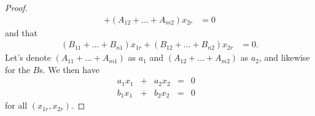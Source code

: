 \documentclass[12pt]{article}
\begin{document}
\begin{enumerate}
\begin{thm}
\begin{proof}
\begin{align*}
          + (A_{12} + \ldots + A_{m2})x_{2r}
          &= 0
        \end{align*}
        and that
        \begin{align*}
        (B_{11} + \ldots + B_{n1})x_{1r}
          + (B_{12} + \ldots + B_{n2})x_{2r}
          &= 0.
        \end{align*}
        Let's denote $(A_{11} + \ldots + A_{m1})$ as $a_1$ and
        $(A_{12} + \ldots + A_{m2})$ as $a_2$, and likewise for
        the $B$s. We then have
        \begin{equation*}
        \begin{array}{cccccc}
          a_{1}x_1 & + & a_{2}x_2 & = & 0 &\\
          b_{1}x_1 & + & b_{2}x_2 & = & 0 &
        \end{array}
        \end{equation*}
        for all $(x_{1r},x_{2r})$.


\end{proof}
\end{thm}
\end{enumerate}
\end{document}
